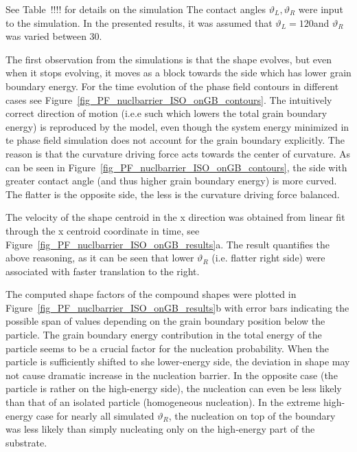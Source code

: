 \alert{See Table~!!!! for details on the simulation} The contact angles $\vartheta_L,\vartheta_R$ were input to the simulation. In the presented results, it was assumed that $\vartheta_L=120$\textdegree and $\vartheta_R$ was varied between 30\textdegree.

The first observation from the simulations is that the shape evolves, but even when it stops evolving, it moves as a block towards the side which has lower grain boundary energy. For the time evolution of the phase field contours in different cases see Figure~\ref{fig_PF_nuclbarrier_ISO_onGB_contours}. The intuitively correct direction of motion (i.e.e such which lowers the total grain boundary energy) is reproduced by the model, even though the system energy minimized in te phase field simulation does not account for the grain boundary explicitly. The reason is that the curvature driving force acts towards the center of curvature. As can be seen in Figure~\ref{fig_PF_nuclbarrier_ISO_onGB_contours}, the side with greater contact angle (and thus higher grain boundary energy) is more curved. The flatter is the opposite side, the less is the curvature driving force balanced. 

The velocity of the shape centroid in the x direction was obtained from linear fit through the x centroid coordinate in time, see Figure~\ref{fig_PF_nuclbarrier_ISO_onGB_results}a. The result quantifies the above reasoning, as it can be seen that lower $\vartheta_R$ (i.e. flatter right side) were associated with faster translation to the right.

The computed shape factors of the compound shapes were plotted in Figure~\ref{fig_PF_nuclbarrier_ISO_onGB_results}b with error bars indicating the possible span of values depending on the grain boundary position below the particle. The grain boundary energy contribution in the total energy of the particle seems to be a crucial factor for the nucleation probability. When the particle is sufficiently shifted to she lower-energy side, the deviation in shape may not cause dramatic increase in the nucleation barrier. In the opposite case (the particle is rather on the high-energy side), the nucleation can even be less likely than that of an isolated particle (homogeneous nucleation). In the extreme high-energy case for nearly all simulated $\vartheta_R$, the nucleation on top of the boundary was less likely than simply nucleating only on the high-energy part of the substrate. 

